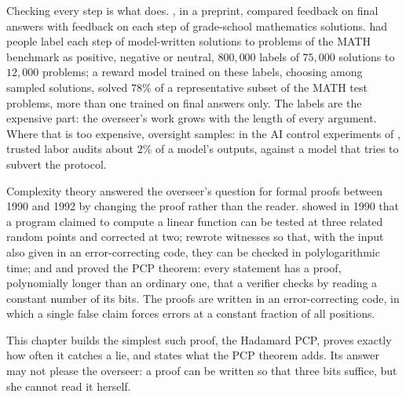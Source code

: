 \begin{refsection}
Checking every step is what  does. \Textcite{UesatoEtAl2022}, in a preprint, compared feedback on final answers with feedback on each step of grade-school mathematics solutions. \Textcite{LightmanEtAl2024} had people label each step of model-written solutions to problems of the MATH benchmark as positive, negative or neutral, $800{,}000$ labels of $75{,}000$ solutions to $12{,}000$ problems; a reward model trained on these labels, choosing among sampled solutions, solved $78\%$ of a representative subset of the MATH test problems, more than one trained on final answers only. The labels are the expensive part: the overseer's work grows with the length of every argument. Where that is too expensive, oversight samples: in the AI control experiments of \textcite{GreenblattEtAl2024}, trusted labor audits about $2\%$ of a model's outputs, against a model that tries to subvert the protocol.

Complexity theory answered the overseer's question for formal proofs between 1990 and 1992 by changing the proof rather than the reader. \Textcite{BlumLubyRubinfeld1993} showed in 1990 that a program claimed to compute a linear function can be tested at three related random points and corrected at two; \textcite{BabaiEtAl1991} rewrote  witnesses so that, with the input also given in an error-correcting code, they can be checked in polylogarithmic time; and \textcite{AroraSafra1998} and \textcite{AroraEtAl1998} proved the PCP theorem: every  statement has a proof, polynomially longer than an ordinary one, that a verifier checks by reading a constant number of its bits. The proofs are written in an error-correcting code, in which a single false claim forces errors at a constant fraction of all positions.

This chapter builds the simplest such proof, the Hadamard PCP, proves exactly how often it catches a lie, and states what the PCP theorem adds. Its answer may not please the overseer: a proof can be written so that three bits suffice, but she cannot read it herself.


\end{refsection}
